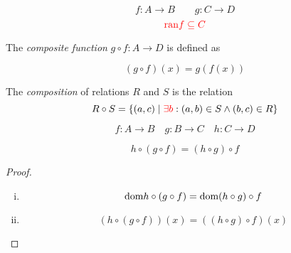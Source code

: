 
\begin{frame}{}
  \begin{center}
  \end{center}

\end{frame}

\begin{frame}{}
  \begin{definition}[Composition]
    \[
      f: A \to B \qquad g: C \to D
    \]
    \[
      \textcolor{red}{\text{ran}{f} \subseteq C}
    \]

    The {\it composite function} $g \circ f: A \to D$ is defined as

    \[
      (g \circ f) (x) = g(f(x))
    \]
  \end{definition}

  \pause
  \vspace{0.20cm}
  \begin{center}
  \end{center}

  \vspace{-0.30cm}
  \begin{definition}[Composition]
    The {\it composition} of relations $R$ and $S$ is the relation
    \[
      R \circ S = \{(a, c) \mid \textcolor{red}{\exists b}: (a, b) \in S \land (b, c) \in R\}
    \]
  \end{definition}
\end{frame}

\begin{frame}{}
  \begin{theorem}
    \[
      f: A \to B \quad g: B \to C \quad h: C \to D
    \]

    \[
      h \circ (g \circ f) = (h \circ g) \circ f
    \]
  \end{theorem}

  \pause
  \vspace{0.60cm}
  \begin{proof}
    \pause
    \begin{enumerate}[(i)]
      \item 
	\[
	  \text{dom}{h \circ (g \circ f)} = \text{dom}{(h \circ g) \circ f}
	\]
      \item 
	\[
	  (h \circ (g \circ f))(x) = ((h \circ g) \circ f)(x)
	\]
    \end{enumerate}
  \end{proof}
\end{frame}

